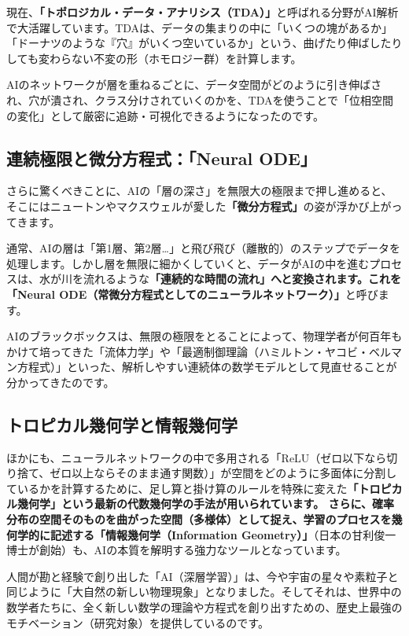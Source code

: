 現在、\textbf{「トポロジカル・データ・アナリシス（TDA）」}と呼ばれる分野がAI解析で大活躍しています。TDAは、データの集まりの中に「いくつの塊があるか」「ドーナツのような『穴』がいくつ空いているか」という、曲げたり伸ばしたりしても変わらない不変の形（ホモロジー群）を計算します。

AIのネットワークが層を重ねるごとに、データ空間がどのように引き伸ばされ、穴が潰され、クラス分けされていくのかを、TDAを使うことで「位相空間の変化」として厳密に追跡・可視化できるようになったのです。

\subsection{連続極限と微分方程式：「Neural ODE」}

さらに驚くべきことに、AIの「層の深さ」を無限大の極限まで押し進めると、そこにはニュートンやマクスウェルが愛した\textbf{「微分方程式」}の姿が浮かび上がってきます。

通常、AIの層は「第1層、第2層\ldots{}」と飛び飛び（離散的）のステップでデータを処理します。しかし層を無限に細かくしていくと、データがAIの中を進むプロセスは、水が川を流れるような\textbf{「連続的な時間の流れ」へと変換されます。これを「Neural ODE（常微分方程式としてのニューラルネットワーク）」}と呼びます。

AIのブラックボックスは、無限の極限をとることによって、物理学者が何百年もかけて培ってきた「流体力学」や「最適制御理論（ハミルトン・ヤコビ・ベルマン方程式）」といった、解析しやすい連続体の数学モデルとして見直せることが分かってきたのです。

\subsection{トロピカル幾何学と情報幾何学}

ほかにも、ニューラルネットワークの中で多用される「ReLU（ゼロ以下なら切り捨て、ゼロ以上ならそのまま通す関数）」が空間をどのように多面体に分割しているかを計算するために、足し算と掛け算のルールを特殊に変えた\textbf{「トロピカル幾何学」という最新の代数幾何学の手法が用いられています。 さらに、確率分布の空間そのものを曲がった空間（多様体）として捉え、学習のプロセスを幾何学的に記述する「情報幾何学（Information Geometry）」}（日本の甘利俊一博士が創始）も、AIの本質を解明する強力なツールとなっています。

人間が勘と経験で創り出した「AI（深層学習）」は、今や宇宙の星々や素粒子と同じように「大自然の新しい物理現象」となりました。そしてそれは、世界中の数学者たちに、全く新しい数学の理論や方程式を創り出すための、歴史上最強のモチベーション（研究対象）を提供しているのです。

